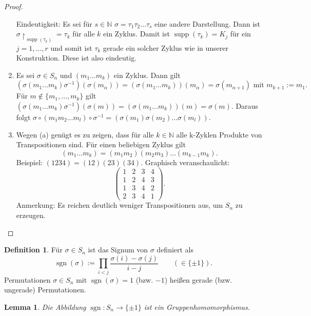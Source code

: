 \documentclass[12pt]{scrartcl} %
\DeclareMathOperator{\sgn}{sgn}
\DeclareMathOperator{\supp}{supp}
\newcommand{\Inv}[1]{#1^{-1}}
\newtheorem{lemma}{Lemma}
\theoremstyle{definition}
\newtheorem*{defn}{Definition}
\theoremstyle{remark}
\begin{document}
\begin{proof}
\begin{enumerate}[label=(\alph*)]
		Eindeutigkeit: Es sei für $s\in\mathbb{N}$ $\sigma = \tau_1\tau_2\dots\tau_s$ eine andere Darstellung.
		Dann ist $\sigma\upharpoonright_{\supp(\tau_k)} = \tau_k$ für alle $k$ ein Zyklus.
		Damit ist $\supp(\tau_k) = K_j$ für ein $j=1,\dots,r$ und somit ist $\tau_k$ gerade ein solcher Zyklus wie in unserer Konstruktion.
		Diese ist also eindeutig.
	\item Es sei $\sigma\in S_n$ und $(m_1\dots m_k)$ ein Zyklus. Dann gilt
		\[(\sigma(m_1\dots m_k)\Inv\sigma)(\sigma(m_{\alpha}))=(\sigma(m_1\dots m_k))(m_{\alpha}) = \sigma(m_{\alpha+1})\text{ mit }m_{k+1}:=m_1.\] 
		Für $m\notin \{m_1,\dots,m_k\}$ gilt $(\sigma(m_1\dots m_k)\sigma^{-1})(\sigma(m))=(\sigma(m_1\dots m_k))(m) = \sigma(m)$.
		Daraus folgt $\sigma\circ(m_1m_2\dots m_l)\circ\sigma^{-1} = (\sigma(m_1)\sigma(m_2)\dots\sigma(m_l))$.
	\item Wegen (a) genügt es zu zeigen, dass für alle $k\in\mathbb{N}$ alle k-Zyklen Produkte von Transpositionen sind.
		Für einen beliebigen Zyklus gilt
		\[(m_1\dots m_k) = (m_1m_2)(m_2m_3)\dots (m_{k-1}m_k).\]
		Beispiel: $(1234) = (12)(23)(34)$. Graphisch veranschaulicht:
		\[\begin{pmatrix}
		1 & 2 & 3 & 4 \\ %
		1 & 2 & 4 & 3 \\ %
		1 & 3 & 4 & 2 \\ %
		2 & 3 & 4 & 1
		\end{pmatrix}.\]
		Anmerkung: Es reichen deutlich weniger Transpositionen aus, um $S_n$ zu erzeugen.\qedhere
	\end{enumerate}
\end{proof}

\begin{defn}
	Für $\sigma\in S_n$ ist das Signum von $\sigma$ definiert als
	\[\sgn(\sigma) := \prod_{i<j}\frac{\sigma(i)-\sigma(j)}{i-j}\qquad(\in\{\pm 1\}).\]
	Permutationen $\sigma\in S_n$ mit $\sgn(\sigma) = 1$ (bzw. $-1$) heißen gerade (bzw. ungerade) Permutationen.
\end{defn}

\begin{lemma}
	Die Abbildung $\sgn:S_n\to\{\pm 1\}$ ist ein Gruppenhomomorphismus.
\end{lemma}
\end{document}
